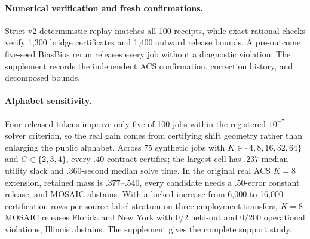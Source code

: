 \paragraph{Numerical verification and fresh confirmations.}
Strict-v2 deterministic replay matches all 100 receipts, while exact-rational
checks verify 1,300 bridge certificates and 1,400 outward release bounds. A
pre-outcome five-seed BiasBios rerun releases every job without a diagnostic
violation. The supplement records the independent ACS confirmation, correction
history, and decomposed bounds.



\paragraph{Alphabet sensitivity.}
Four released tokens improve only five of 100 jobs within the registered
$10^{-7}$ solver criterion, so the real gain comes from certifying shift
geometry rather than enlarging the public alphabet. Across 75 synthetic jobs
with $K\in\{4,8,16,32,64\}$ and $G\in\{2,3,4\}$, every $.40$ contract
certifies; the largest cell has $.237$ median utility slack and $.360$-second
median solve time. In the original real ACS $K=8$ extension, retained mass is
$.377$--$.540$, every candidate needs a $.50$-error constant release, and
MOSAIC abstains. With a locked increase from 6,000 to 16,000 certification
rows per source--label stratum on three employment transfers, $K=8$ MOSAIC
releases Florida and New York with 0/2 held-out and 0/200 operational
violations; Illinois abstains. The supplement gives the complete support study.
